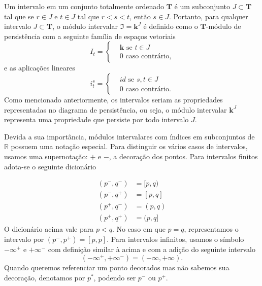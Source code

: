 Um intervalo em um conjunto totalmente ordenado $\mathbf{T}$ é um subconjunto $J \subset \mathbf{T}$ tal que se 
$r \in J$ e $t \in J$ tal que $r < s < t$, então $s \in J$. Portanto, para qualquer intervalo $J \subset \mathbf{T}$,
o módulo intervalar $\mathfrak{I} = \mathbf{k}^J$ é definido como o $\mathbf{T}$-módulo de persistência com a 
seguinte família de espaços vetoriais
\begin{equation*}
    I_t = \left\{
    \begin{split}
        & \mathbf{k} \text{ se } t \in J \\
        & 0 \text{ caso contrário,}
    \end{split}
    \right.
\end{equation*} 
e as aplicações lineares
\begin{equation*}
    i_t^s = \left\{
    \begin{split}
        & id \text{ se } s,t \in J \\
        & 0 \text{ caso contrário.}
    \end{split}
    \right.
\end{equation*}
Como mencionado anteriormente, os intervalos seriam as propriedades representadas no diagrama de persistência, 
ou seja, o módulo intervalar $\mathbf{k}^J$ representa uma propriedade que persiste por todo intervalo $J$.

Devida a sua importância, módulos intervalares com índices em subconjuntos de $\mathbb{R}$ possuem uma notação 
especial. Para distinguir os vários casos de intervalos, usamos uma supernotação: $+$ e $-$, a decoração dos pontos.
Para intervalos finitos adota-se o seguinte dicionário

\begin{align*}
    (p^-, q^-) &= [p,q) \\ 
    (p^-, q^+) &= [p,q] \\
    (p^+, q^-) &= (p,q) \\
    (p^+, q^+) &= (p,q]
\end{align*}
O dicionário acima vale para $p < q$. No caso em que $p=q$, representamos o intervalo por $(p^-, p^+) = [p,p]$. 
Para intervalos infinitos, usamos o símbolo $-\infty^+$ e $+\infty^-$ com definição similar à acima e com a adição
do seguinte intervalo
\begin{equation*}
    (-\infty^+, +\infty^-) = (-\infty, +\infty).
\end{equation*}
Quando queremos referenciar um ponto decorados mas não sabemos sua decoração, denotamos por $p^*$, podendo ser 
$p^-$ ou $p^+$. 

